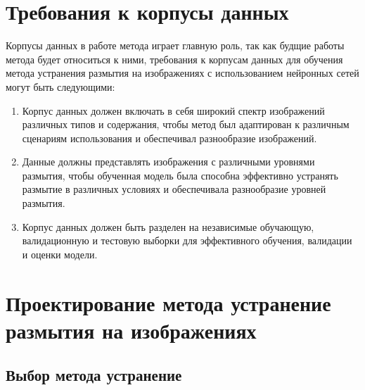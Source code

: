 

\section{Требования к корпусы данных}

Корпусы данных в работе метода играет главную роль, так как будщие работы метода будет относиться к ними, требования к корпусам данных для обучения метода устранения размытия на изображениях с использованием нейронных сетей могут быть следующими:

\begin{enumerate}
    \item Корпус данных должен включать в себя широкий спектр изображений различных типов и содержания, чтобы метод был адаптирован к различным сценариям использования и обеспечивал разнообразие изображений.

    \item Данные должны представлять изображения с различными уровнями размытия, чтобы обученная модель была способна эффективно устранять размытие в различных условиях и обеспечивала разнообразие уровней размытия.


    \item Корпус данных должен быть разделен на независимые обучающую, валидационную и тестовую выборки для эффективного обучения, валидации и оценки модели.
\end{enumerate}

\section{Проектирование метода устранение размытия на изображениях}

\subsection{Выбор метода устранение}

